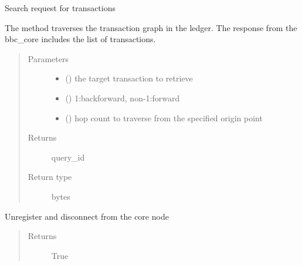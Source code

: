 \documentclass[letterpaper,10pt,english]{sphinxmanual}
\begin{document}
\begin{fulllineitems}

\begin{fulllineitems}
\label{\detokenize{bbc1.core.bbc_app:bbc1.core.bbc_app.BBcAppClient.traverse_transactions}}
Search request for transactions

The method traverses the transaction graph in the ledger.
The response from the bbc\_core includes the list of transactions.
\begin{quote}\begin{description}
\item[{Parameters}] \leavevmode\begin{itemize}
\item {} 
 () \textendash{} the target transaction to retrieve

\item {} 
 () \textendash{} 1:backforward, non-1:forward

\item {} 
 () \textendash{} hop count to traverse from the specified origin point

\end{itemize}

\item[{Returns}] \leavevmode
query\_id

\item[{Return type}] \leavevmode
bytes

\end{description}\end{quote}

\end{fulllineitems}


\begin{fulllineitems}
\label{\detokenize{bbc1.core.bbc_app:bbc1.core.bbc_app.BBcAppClient.unregister_from_core}}
Unregister and disconnect from the core node
\begin{quote}\begin{description}
\item[{Returns}] \leavevmode
True


\end{description}
\end{quote}
\end{fulllineitems}
\end{fulllineitems}
\end{document}
